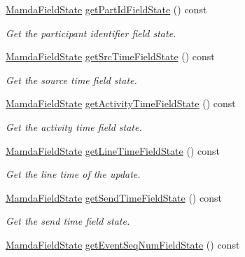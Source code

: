 \begin{CompactItemize}
\hyperlink{namespaceWombat_93aac974f2ab713554fd12a1fa3b7d2a}{Mamda\-Field\-State} \hyperlink{classWombat_1_1MamdaCurrencyListener_78906357e4729fb45bf3e80b4d625689}{get\-Part\-Id\-Field\-State} () const 
\begin{CompactList}\small\item\em Get the participant identifier field state. \item\end{CompactList}\item 
\hyperlink{namespaceWombat_93aac974f2ab713554fd12a1fa3b7d2a}{Mamda\-Field\-State} \hyperlink{classWombat_1_1MamdaCurrencyListener_8a309624a9e76fb5e943560e17dd7bf8}{get\-Src\-Time\-Field\-State} () const 
\begin{CompactList}\small\item\em Get the source time field state. \item\end{CompactList}\item 
\hyperlink{namespaceWombat_93aac974f2ab713554fd12a1fa3b7d2a}{Mamda\-Field\-State} \hyperlink{classWombat_1_1MamdaCurrencyListener_7ad1cdb959dcb619780b27383704d157}{get\-Activity\-Time\-Field\-State} () const 
\begin{CompactList}\small\item\em Get the activity time field state. \item\end{CompactList}\item 
\hyperlink{namespaceWombat_93aac974f2ab713554fd12a1fa3b7d2a}{Mamda\-Field\-State} \hyperlink{classWombat_1_1MamdaCurrencyListener_a1c7db47ff4db093c4d13fddc44fd7e6}{get\-Line\-Time\-Field\-State} () const 
\begin{CompactList}\small\item\em Get the line time of the update. \item\end{CompactList}\item 
\hyperlink{namespaceWombat_93aac974f2ab713554fd12a1fa3b7d2a}{Mamda\-Field\-State} \hyperlink{classWombat_1_1MamdaCurrencyListener_5cbf04e2668f868816b2d7b6461d97dc}{get\-Send\-Time\-Field\-State} () const 
\begin{CompactList}\small\item\em Get the send time field state. \item\end{CompactList}\item 
\hyperlink{namespaceWombat_93aac974f2ab713554fd12a1fa3b7d2a}{Mamda\-Field\-State} \hyperlink{classWombat_1_1MamdaCurrencyListener_811aa7d57b26e148bbcbfd66f7f4f963}{get\-Event\-Seq\-Num\-Field\-State} () const 

\end{CompactItemize}
